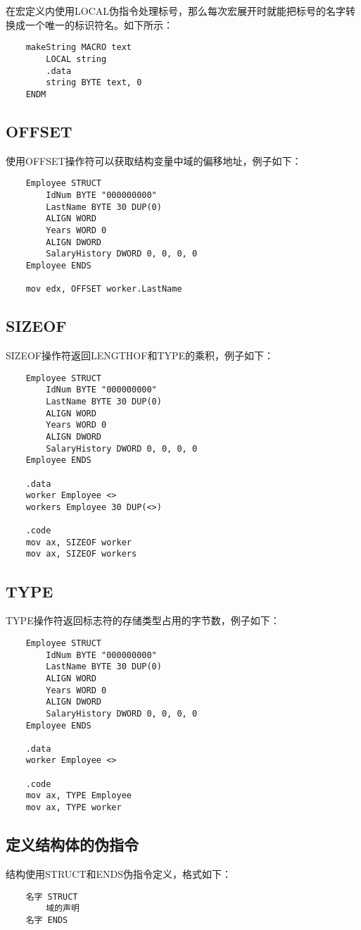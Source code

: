 \documentclass[a4paper,left=2.5cm,right=2.5cm,11pt]{article}
\begin{document}
	在宏定义内使用LOCAL伪指令处理标号，那么每次宏展开时就能把标号的名字转换成一个唯一的标识符名。如下所示：
	\begin{lstlisting}
	makeString MACRO text
		LOCAL string
		.data
		string BYTE text, 0
	ENDM
	\end{lstlisting}

\subsection{OFFSET}
	使用OFFSET操作符可以获取结构变量中域的偏移地址，例子如下：
	\begin{lstlisting}
	Employee STRUCT
		IdNum BYTE "000000000"
		LastName BYTE 30 DUP(0)
		ALIGN WORD
		Years WORD 0
		ALIGN DWORD
		SalaryHistory DWORD 0, 0, 0, 0
	Employee ENDS

	mov edx, OFFSET worker.LastName	
	\end{lstlisting}

\subsection{SIZEOF}
	SIZEOF操作符返回LENGTHOF和TYPE的乘积，例子如下：
	\begin{lstlisting}
	Employee STRUCT
		IdNum BYTE "000000000"
		LastName BYTE 30 DUP(0)
		ALIGN WORD
		Years WORD 0
		ALIGN DWORD
		SalaryHistory DWORD 0, 0, 0, 0
	Employee ENDS

	.data
	worker Employee <>
	workers Employee 30 DUP(<>)

	.code
	mov ax, SIZEOF worker
	mov ax, SIZEOF workers
	\end{lstlisting}

\subsection{TYPE}
	TYPE操作符返回标志符的存储类型占用的字节数，例子如下：
	\begin{lstlisting}
	Employee STRUCT
		IdNum BYTE "000000000"
		LastName BYTE 30 DUP(0)
		ALIGN WORD
		Years WORD 0
		ALIGN DWORD
		SalaryHistory DWORD 0, 0, 0, 0
	Employee ENDS

	.data
	worker Employee <>

	.code
	mov ax, TYPE Employee
	mov ax, TYPE worker
	\end{lstlisting}

\subsection{定义结构体的伪指令}
	结构使用STRUCT和ENDS伪指令定义，格式如下：
	\begin{lstlisting}
	名字 STRUCT
		域的声明
	名字 ENDS
	\end{lstlisting}
\end{document}
